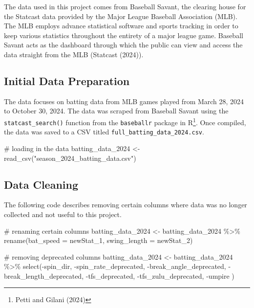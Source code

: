 \documentclass[
  letterpaper,
  DIV=11,
  numbers=noendperiod]{scrartcl}
\newenvironment{Shaded}{\begin{snugshade}}{\end{snugshade}}
\newcommand{\AttributeTok}[1]{\textcolor[rgb]{0.40,0.45,0.13}{#1}}
\newcommand{\CommentTok}[1]{\textcolor[rgb]{0.37,0.37,0.37}{#1}}
\newcommand{\FunctionTok}[1]{\textcolor[rgb]{0.28,0.35,0.67}{#1}}
\newcommand{\NormalTok}[1]{\textcolor[rgb]{0.00,0.23,0.31}{#1}}
\newcommand{\OtherTok}[1]{\textcolor[rgb]{0.00,0.23,0.31}{#1}}
\newcommand{\SpecialCharTok}[1]{\textcolor[rgb]{0.37,0.37,0.37}{#1}}
\newcommand{\StringTok}[1]{\textcolor[rgb]{0.13,0.47,0.30}{#1}}
\begin{document}
The data used in this project comes from Baseball Savant, the clearing
house for the Statcast data provided by the Major League Baseball
Association (MLB). The MLB employs advance statistical software and
sports tracking in order to keep various statistics throughout the
entirety of a major league game. Baseball Savant acts as the dashboard
through which the public can view and access the data straight from the
MLB (Statcast (2024)).

\subsection{Initial Data Preparation}\label{initial-data-preparation}

The data focuses on batting data from MLB games played from March 28,
2024 to October 30, 2024. The data was scraped from Baseball Savant
using the \texttt{statcast\_search()} function from the
\texttt{baseballr} package in R\footnote{Petti and Gilani (2024)}. Once
compiled, the data was saved to a CSV titled
\texttt{full\_batting\_data\_2024.csv}.

\begin{Shaded}
\begin{Highlighting}[]
\CommentTok{\# loading in the data }
\NormalTok{batting\_data\_2024 }\OtherTok{\textless{}{-}} \FunctionTok{read\_csv}\NormalTok{(}\StringTok{"season\_2024\_batting\_data.csv"}\NormalTok{)}
\end{Highlighting}
\end{Shaded}

\subsection{Data Cleaning}\label{data-cleaning}

The following code describes removing certain columns where data was no
longer collected and not useful to this project.

\begin{Shaded}
\begin{Highlighting}[]
\CommentTok{\# renaming certain columns }
\NormalTok{batting\_data\_2024 }\OtherTok{\textless{}{-}}\NormalTok{ batting\_data\_2024 }\SpecialCharTok{\%\textgreater{}\%}
  \FunctionTok{rename}\NormalTok{(}\AttributeTok{bat\_speed =}\NormalTok{ newStat\_1,}
         \AttributeTok{swing\_length =}\NormalTok{ newStat\_2)}

\CommentTok{\# removing deprecated columns }
\NormalTok{batting\_data\_2024 }\OtherTok{\textless{}{-}}\NormalTok{ batting\_data\_2024 }\SpecialCharTok{\%\textgreater{}\%}
  \FunctionTok{select}\NormalTok{(}\SpecialCharTok{{-}}\NormalTok{spin\_dir,}
         \SpecialCharTok{{-}}\NormalTok{spin\_rate\_deprecated,}
         \SpecialCharTok{{-}}\NormalTok{break\_angle\_deprecated,}
         \SpecialCharTok{{-}}\NormalTok{break\_length\_deprecated,}
         \SpecialCharTok{{-}}\NormalTok{tfs\_deprecated,}
         \SpecialCharTok{{-}}\NormalTok{tfs\_zulu\_deprecated,}
         \SpecialCharTok{{-}}\NormalTok{umpire}
\NormalTok{         )}
\end{Highlighting}
\end{Shaded}
\end{document}
